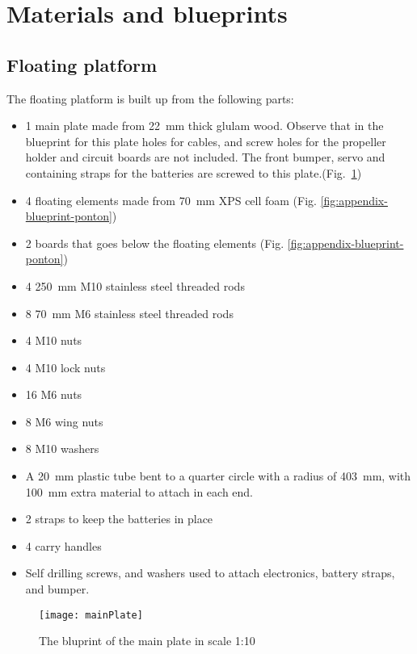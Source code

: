 \section{Materials and blueprints}

\subsection{Floating platform}

The floating platform is built up from the following parts:

\begin{itemize}
  \item 1 main plate made  from 22~mm thick glulam wood. Observe that in the
    blueprint for this plate holes for cables, and screw holes for the
    propeller holder and circuit boards are not included. The front bumper,
    servo and containing straps for the batteries are screwed to this plate.(Fig.~\ref{fig:appendix-blueprint-main-plate})
  \item 4 floating elements made from 70~mm XPS cell foam (Fig. \ref{fig:appendix-blueprint-ponton})
  \item 2 boards that goes below the floating elements (Fig. \ref{fig:appendix-blueprint-ponton})
  \item 4 250~mm M10 stainless steel threaded rods
  \item 8 70~mm M6 stainless steel threaded rods
  \item 4 M10 nuts
  \item 4 M10 lock nuts
  \item 16 M6 nuts
  \item 8 M6 wing nuts
  \item 8 M10 washers
  \item A 20~mm plastic tube bent to a quarter circle with a radius of 403~mm,
    with 100~mm extra material to attach in each end.
  \item 2 straps to keep the batteries in place
  \item 4 carry handles
  \item Self drilling screws, and washers used to attach electronics, battery
    straps, and bumper.
  \end{itemize}

  \begin{figure}
    \centering
    \texttt{[image: mainPlate]}

    \caption{The bluprint of the main plate in scale 1:10}
    \label{fig:appendix-blueprint-main-plate}
\end{figure}


